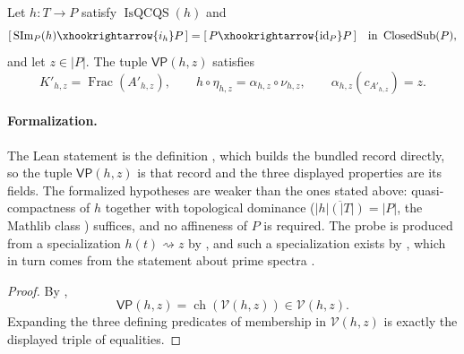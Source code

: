 \begin{lemma}
  \label{lemma:nagata-dense-valuation-probe}
  \leanok

  Let $h\colon T\to P$ satisfy $\operatorname{IsQCQS}(h)$ and
  \[
    [\,\operatorname{SIm}_P(h)\xhookrightarrow{i_h}P\,]
      =[\,P\xhookrightarrow{\operatorname{id}_P}P\,]
      \quad\text{in }\operatorname{ClosedSub}(P),
  \]
  and let $z\in|P|$.  The tuple
  $\mathsf{VP}(h,z)$ satisfies
  \[
    K'_{h,z}=\operatorname{Frac}(A'_{h,z}),
    \qquad
    h\circ\eta_{h,z}=\alpha_{h,z}\circ\nu_{h,z},
    \qquad
    \alpha_{h,z}(c_{A'_{h,z}})=z.
  \]

  \paragraph{Formalization.}
  The Lean statement is the definition
  \texttt{}, which builds
  the bundled record \texttt{}
  directly, so the tuple $\mathsf{VP}(h,z)$ is that record and the three displayed
  properties are its fields.  The formalized hypotheses are weaker
  than the ones stated above: quasi-compactness of $h$ together with topological dominance
  ($\overline{|h|(|T|)}=|P|$, the Mathlib class
  \texttt{}) suffices, and no affineness of $P$
  is required.  The probe is produced from a specialization $h(t)\rightsquigarrow z$ by
  \texttt{}, and such
  a specialization exists by
  \texttt{}, which in
  turn comes from the statement about prime spectra
  \texttt{}.
\end{lemma}

\begin{proof}
  By ,
  \[
    \mathsf{VP}(h,z)=\operatorname{ch}(\mathscr V(h,z))
      \in\mathscr V(h,z).
  \]
  Expanding the three defining predicates of membership in
  $\mathscr V(h,z)$ is exactly the displayed triple of equalities.
\end{proof}


